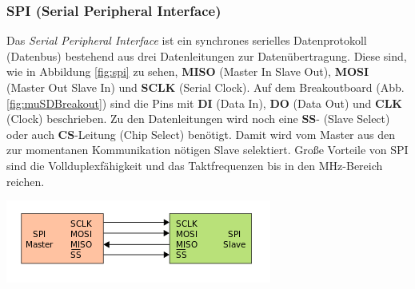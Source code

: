 \subsubsection{SPI (Serial Peripheral Interface)}
\label{subsubsec:spi}
\begin{minipage}{0.48\textwidth}
Das \textit{Serial Peripheral Interface} ist ein synchrones serielles Datenprotokoll (Datenbus) bestehend aus drei Datenleitungen zur Datenübertragung. Diese sind, wie in Abbildung \ref{fig:spi} zu sehen, \textbf{MISO} (Master In Slave Out), \textbf{MOSI} (Master Out Slave In) und \textbf{SCLK} (Serial Clock). Auf dem Breakoutboard (Abb. \ref{fig:muSDBreakout}) sind die Pins mit \textbf{DI} (Data In), \textbf{DO} (Data Out) und \textbf{CLK} (Clock) beschrieben. Zu den Datenleitungen wird noch eine \textbf{SS}- (Slave Select) oder auch \textbf{CS}-Leitung (Chip Select) benötigt. Damit wird vom Master aus den zur momentanen Kommunikation nötigen Slave selektiert. Große Vorteile von SPI sind die Vollduplexfähigkeit und das Taktfrequenzen bis in den MHz-Bereich reichen. \cite{spi}\cite{Wikipedia2018spi}\\
\end{minipage}
\begin{minipage}{0.51\textwidth}
\centering
\includegraphics[width=\textwidth]{graphics/Datenspeicherung/spi_master_slave.png}
\label{fig:spi}
\end{minipage}

